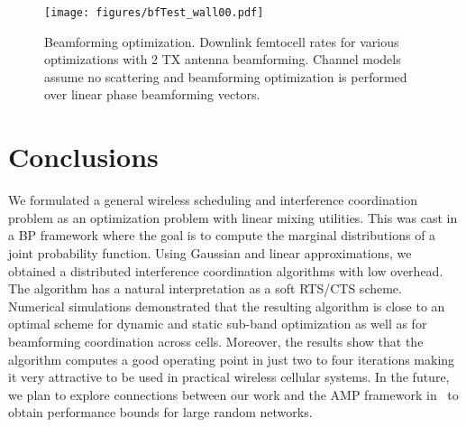 \documentclass[letterpaper,twocolumn,twoside]{IEEEtran}
\begin{document}
\begin{figure}
\begin{center}
\texttt{[image: figures/bfTest\_wall00.pdf]}
\end{center}
\caption{Beamforming optimization.
Downlink femtocell rates for
various optimizations with 2 TX antenna beamforming.
Channel models assume no scattering and beamforming optimization
is performed over linear phase beamforming vectors.
}
\label{fig:bfSim}
\end{figure}

\section{Conclusions} \label{sec:conclusions}

We formulated a general wireless scheduling and interference
coordination problem as an optimization problem with linear mixing
utilities. This was cast in a BP framework where the goal is to
compute the marginal distributions of a joint probability function.
Using Gaussian and linear approximations, we obtained a distributed
interference coordination algorithms with low overhead. The
algorithm has a natural interpretation as a soft RTS/CTS scheme.
Numerical simulations demonstrated that the resulting algorithm is
close to an optimal scheme for dynamic and static sub-band
optimization as well as for beamforming coordination across cells.
Moreover, the results show that the algorithm computes a good
operating point in just two to four iterations making it very
attractive to be used in practical wireless cellular systems. In the
future, we plan to explore connections between our work and the AMP
framework in~\cite{MontanariT:06} to obtain performance bounds for
large random networks.





\end{document}
